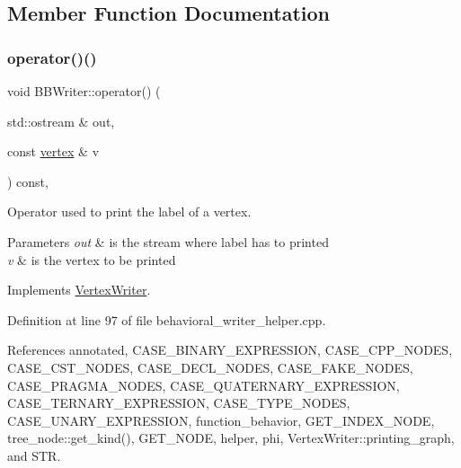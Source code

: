 \subsection{Member Function Documentation}
\mbox{\label{classBBWriter_a04cb324b25410008893d31a21d347f2f}} 
\subsubsection{\texorpdfstring{operator()()}{operator()()}}
{\footnotesize\ttfamily void B\+B\+Writer\+::operator() (\begin{DoxyParamCaption}\item[{std\+::ostream \&}]{out,  }\item[{const \hyperlink{graph_8hpp_abefdcf0544e601805af44eca032cca14}{vertex} \&}]{v }\end{DoxyParamCaption}) const\hspace{0.3cm}{\ttfamily [override]}, {\ttfamily [virtual]}}



Operator used to print the label of a vertex. 


\begin{DoxyParams}{Parameters}
{\em out} & is the stream where label has to printed \\
\hline
{\em v} & is the vertex to be printed \\
\hline
\end{DoxyParams}


Implements \hyperlink{classVertexWriter_a9df92a65d6e59d160be56eb8ec5cb84c}{Vertex\+Writer}.



Definition at line 97 of file behavioral\+\_\+writer\+\_\+helper.\+cpp.



References annotated, C\+A\+S\+E\+\_\+\+B\+I\+N\+A\+R\+Y\+\_\+\+E\+X\+P\+R\+E\+S\+S\+I\+ON, C\+A\+S\+E\+\_\+\+C\+P\+P\+\_\+\+N\+O\+D\+ES, C\+A\+S\+E\+\_\+\+C\+S\+T\+\_\+\+N\+O\+D\+ES, C\+A\+S\+E\+\_\+\+D\+E\+C\+L\+\_\+\+N\+O\+D\+ES, C\+A\+S\+E\+\_\+\+F\+A\+K\+E\+\_\+\+N\+O\+D\+ES, C\+A\+S\+E\+\_\+\+P\+R\+A\+G\+M\+A\+\_\+\+N\+O\+D\+ES, C\+A\+S\+E\+\_\+\+Q\+U\+A\+T\+E\+R\+N\+A\+R\+Y\+\_\+\+E\+X\+P\+R\+E\+S\+S\+I\+ON, C\+A\+S\+E\+\_\+\+T\+E\+R\+N\+A\+R\+Y\+\_\+\+E\+X\+P\+R\+E\+S\+S\+I\+ON, C\+A\+S\+E\+\_\+\+T\+Y\+P\+E\+\_\+\+N\+O\+D\+ES, C\+A\+S\+E\+\_\+\+U\+N\+A\+R\+Y\+\_\+\+E\+X\+P\+R\+E\+S\+S\+I\+ON, function\+\_\+behavior, G\+E\+T\+\_\+\+I\+N\+D\+E\+X\+\_\+\+N\+O\+DE, tree\+\_\+node\+::get\+\_\+kind(), G\+E\+T\+\_\+\+N\+O\+DE, helper, phi, Vertex\+Writer\+::printing\+\_\+graph, and S\+TR.

